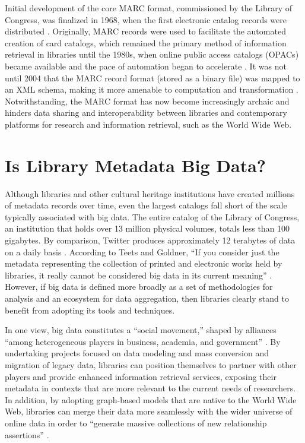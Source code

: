 \documentclass[sigconf]{acmart}
\begin{document}
Initial development of the core MARC format, commissioned by the Library of Congress, was finalized in 1968, when the first electronic catalog records were distributed \cite{kF12}. Originally, MARC records were used to facilitate the automated creation of card catalogs, which remained the primary method of information retrieval in libraries until the 1980s, when online public access catalogs (OPACs) became available and the pace of automation began to accelerate \cite{mT13}. It was not until 2004 that the MARC record format (stored as a binary file) was mapped to an XML schema, making it more amenable to computation and transformation \cite{mX04}. Notwithstanding, the MARC format has now become increasingly archaic and hinders data sharing and interoperability between libraries and contemporary platforms for research and information retrieval, such as the World Wide Web.

\section{Is Library Metadata Big Data?}
Although libraries and other cultural heritage institutions have created millions of metadata records over time, even the largest catalogs fall short of the scale typically associated with big data. The entire catalog of the Library of Congress, an institution that holds over 13 million physical volumes, totals less than 100 gigabytes. By comparison, Twitter produces approximately 12 terabytes of data on a daily basis \cite[p.~1527]{hE15}. According to Teets and Goldner, ``If you consider just the metadata representing the collection of printed and electronic works held by libraries, it really cannot be considered big data in its current meaning'' \cite{mT13}. However, if big data is defined more broadly as a set of methodologies for analysis and an ecosystem for data aggregation, then libraries clearly stand to benefit from adopting its tools and techniques. 

In one view, big data constitutes a ``social movement,'' shaped by alliances ``among heterogeneous players in business, academia, and government'' \cite[p.~1527]{hE15}. By undertaking projects focused on data modeling and mass conversion and migration of legacy data, libraries can position themselves to partner with other players and provide enhanced information retrieval services, exposing their metadata in contexts that are more relevant to the current needs of researchers. In addition, by adopting graph-based models that are native to the World Wide Web, libraries can merge their data more seamlessly with the wider universe of online data in order to ``generate massive collections of new relationship assertions'' \cite{mT13}. 
\end{document}
